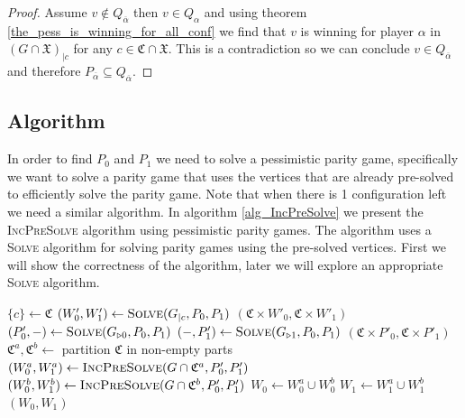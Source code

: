 \begin{lemma}
\begin{proof}
		Assume $v \notin Q_{\overline{\alpha}}$ then $v \in Q_{\alpha}$ and using theorem \ref{the_pess_is_winning_for_all_conf} we find that $v$ is winning for player $\alpha$ in $(G \cap \mathfrak{X})_{|c}$ for any $c \in \mathfrak{C} \cap \mathfrak{X}$. This is a contradiction so we can conclude $v \in Q_{\overline{\alpha}}$ and therefore $P_{\overline{\alpha}} \subseteq Q_{\overline{\alpha}}$.
	\end{proof}
\end{lemma}
\subsection{Algorithm}
In order to find $P_0$ and $P_1$ we need to solve a pessimistic parity game, specifically we want to solve a parity game that uses the vertices that are already pre-solved to efficiently solve the parity game. Note that when there is 1 configuration left we need a similar algorithm. In algorithm \ref{alg_IncPreSolve} we present the \textsc{IncPreSolve} algorithm using pessimistic parity games. The algorithm uses a \textsc{Solve} algorithm for solving parity games using the pre-solved vertices. First we will show the correctness of the algorithm, later we will explore an appropriate \textsc{Solve} algorithm.
\begin{algorithm}
	\caption{$\textsc{IncPreSolve}(G = (V,V_0,V_1, E, \Omega, \mathfrak{C}, \theta), P_0,P_1)$}\label{alg_IncPreSolve}
	\begin{algorithmic}[1]
		\State $\{c\} \gets \mathfrak{C}$
		\State $(W'_0,W'_1) \gets \textsc{Solve}(G_{|c}, P_0,P_1)$
		\State \Return $(\mathfrak{C} \times W'_0, \mathfrak{C} \times W'_1)$
		\EndIf
		\State $(P'_0,-) \gets \textsc{Solve}(G_{\triangleright0}, P_0, P_1)$
		\State $(-,P'_1) \gets \textsc{Solve}(G_{\triangleright1}, P_0, P_1)$
		\State \Return $(\mathfrak{C} \times P'_0, \mathfrak{C} \times P'_1)$
		\EndIf
		\State $\mathfrak{C}^a, \mathfrak{C}^b \gets $ partition $\mathfrak{C}$ in non-empty parts
		\State $(W_0^a, W_1^a) \gets \textsc{IncPreSolve}(G \cap \mathfrak{C}^a, P'_0,P'_1)$
		\State $(W_0^b, W_1^b) \gets \textsc{IncPreSolve}(G \cap \mathfrak{C}^b, P'_0,P'_1)$
		\State $W_0 \gets W_0^a \cup W_0^b$
		\State $W_1 \gets W_1^a \cup W_1^b$
		\State \Return $(W_0,W_1)$
	\end{algorithmic}
\end{algorithm}

